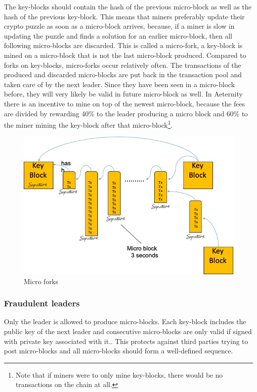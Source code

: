 The key-blocks should contain the hash of the previous micro-block as
well as the hash of the previous key-block. This means that miners
preferably update their crypto puzzle as soon as a micro-block
arrives, because, if a miner is slow in updating the puzzle and finds a solution for an earlier
micro-block, then all following micro-blocks are discarded. This is
called a micro-fork, a key-block is mined on a micro-block that is not
the last micro-block produced. Compared to forks on key-blocks,
micro-forks occur relatively often. The
transactions of the produced and discarded micro-blocks are put back in the
transaction pool and taken care of by the next leader. Since they have
been seen in a micro-block before, they will very likely be valid in
future micro-block as well. In Aeternity there is an incentive to mine
on top of the newest micro-block, because the fees are divided by rewarding 40\%
to the leader producing a micro block and 60\% to the miner mining the key-block after that
micro-block\footnote{Note that if miners
  were to only mine key-blocks, there would be no transactions on the
  chain at all.}.

\begin{figure}
   \includegraphics[scale=0.5]{keymicro.jpg}
  \caption{Micro forks}
\end{figure}

\subsubsection{Fraudulent leaders}

Only the leader is allowed to produce micro-blocks. Each key-block
includes the  public key of the next leader and consecutive micro-blocks are only valid
if signed with private key associated with it.. This protects against third parties trying
to post micro-blocks and all micro-blocks should form a well-defined
sequence.


